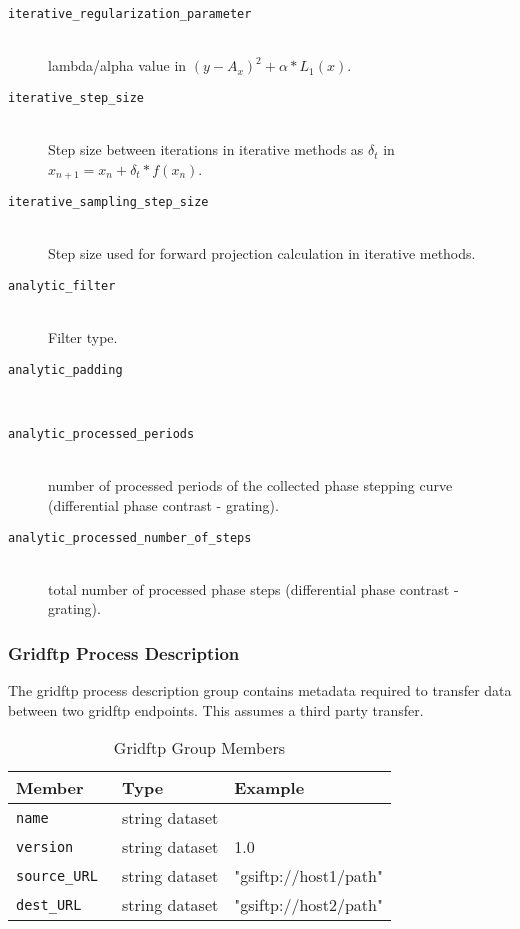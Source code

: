 \begin{description}
\item[\tt{iterative\_regularization\_parameter}] \hfill \\
{lambda/alpha value in $ (y-A_x)^2 + \alpha *L_1(x) $.}

\item[\tt{iterative\_step\_size}] \hfill \\
{Step size between iterations in iterative methods as $\delta_t$ in $ x_{n+1} = x_n + \delta_t * f(x_n)$.}

\item[\tt{iterative\_sampling\_step\_size}] \hfill \\
{Step size used for forward projection calculation in iterative methods.}

\item[\tt{analytic\_filter}] \hfill \\
{Filter type.}

\item[\tt{analytic\_padding}] \hfill \\
{}

\item[\tt{analytic\_processed\_periods}] \hfill \\
{number of processed periods of the collected phase stepping curve (differential phase contrast - grating).}

\item[\tt{analytic\_processed\_number\_of\_steps}] \hfill \\
{total number of processed phase steps (differential phase contrast - grating).}
\end{description}


\subsubsection{Gridftp Process Description}
\label{table:gridftp}

The gridftp process description group contains metadata required to transfer data between two gridftp endpoints. This assumes a third party transfer.

\begin{table}[h!]\sffamily \footnotesize
\caption{Gridftp Group Members}
\centering
{}
\begin{tabular}{l l l}

\toprule
\bfseries Member     & \bfseries Type & \bfseries Example \\
\midrule
\tt{name} & string dataset &  \\  
\tt{version}  & string dataset  & 1.0 \\
\tt{source\_URL} &  string dataset & "gsiftp://host1/path" \\
\tt{dest\_URL} & string dataset & "gsiftp://host2/path" \\
\bottomrule
\end{tabular}
\end{table}

